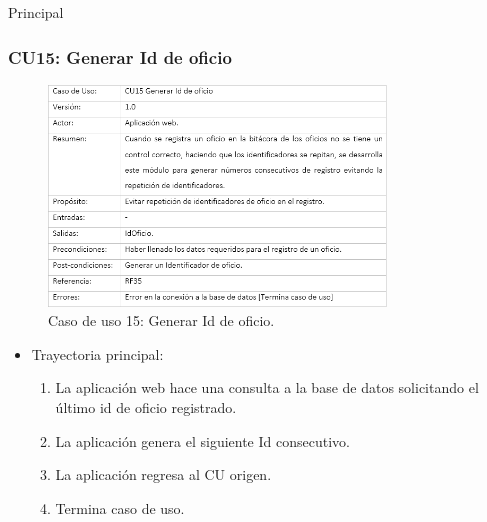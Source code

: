 \begin{UCtrayectoria}{Principal}
\begin{itemize}
\end{itemize}
\newpage
		\subsubsection{CU15: Generar Id de oficio}
\begin{figure}[htbp!]
		\centering
			\includegraphics[width=0.8\textwidth]{images/CU/CU15}
		\caption{Caso de uso 15: Generar Id de oficio.}
		\label{Tabla}
	\end{figure}
	
\begin{itemize}
	\item Trayectoria principal:
	\begin{enumerate}
		\item 	La aplicación web hace una consulta a la base de datos solicitando el último id de oficio registrado.
\item	La aplicación genera el siguiente Id consecutivo.
\item	La aplicación regresa al CU origen. 
\item	Termina caso de uso.

	\end{enumerate}
	
\end{itemize}
\newpage

\end{UCtrayectoria}
